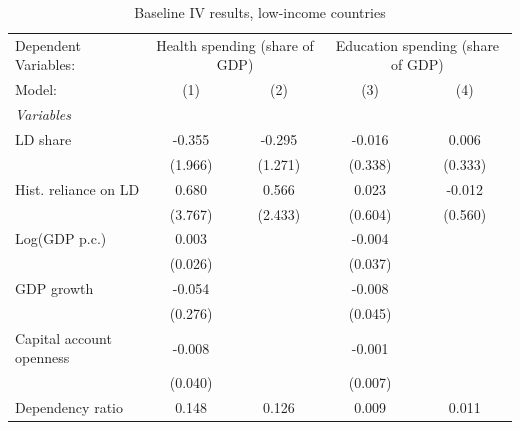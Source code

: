 
\begin{table}[htbp]
   \caption{\label{tab:results_baseline_iv_overall_lics} Baseline IV results, low-income countries}
   \centering
   \begin{tabular}{lcccc}
      \tabularnewline \midrule \midrule
      Dependent Variables: & \multicolumn{2}{c}{Health spending (share of GDP)} & \multicolumn{2}{c}{Education spending (share of GDP)}\\
      Model:                     & (1)                                  & (2)                                & (3)         & (4)\\  
      \midrule
      \emph{Variables}\\
      LD share                   & -0.355                               & -0.295                             & -0.016      & 0.006\\   
                                 & (1.966)                              & (1.271)                            & (0.338)     & (0.333)\\   
      Hist. reliance on LD       & 0.680                                & 0.566                              & 0.023       & -0.012\\   
                                 & (3.767)                              & (2.433)                            & (0.604)     & (0.560)\\   
      Log(GDP p.c.)              & 0.003                                &                                    & -0.004      &   \\   
                                 & (0.026)                              &                                    & (0.037)     &   \\   
      GDP growth                 & -0.054                               &                                    & -0.008      &   \\   
                                 & (0.276)                              &                                    & (0.045)     &   \\   
      Capital account openness   & -0.008                               &                                    & -0.001      &   \\   
                                 & (0.040)                              &                                    & (0.007)     &   \\   
      Dependency ratio           & 0.148                                & 0.126                              & 0.009       & 0.011\\   

\end{tabular}
\end{table}
